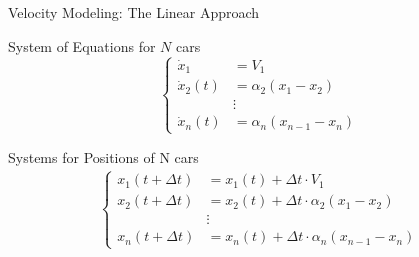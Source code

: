 \documentclass{beamer}
\begin{document}
\begin{frame}{Velocity Modeling: The Linear Approach}
	\begin{block}{System of Equations for $N$ cars}
		\[
		\left\{
		\begin{array}{ll}
			\dot{x}_1 &= V_1 \\
			\dot{x}_2(t) &= \alpha_2(x_1 - x_2) \\
			&\vdots \\
			\dot{x}_n(t) &= \alpha_n(x_{n-1} - x_n)
		\end{array}
		\right.
		\]
	\end{block}
	
	\begin{block}{Systems for Positions of N cars}
		\begin{align*}
			\left\{
			\begin{array}{ll}
				x_1(t + \Delta t) &= x_1(t) + \Delta t  \cdot V_1\\
				x_2(t + \Delta t) &= x_2(t) + \Delta t  \cdot \alpha_2(x_1 - x_2) \\
				&\vdots \\
				x_n(t + \Delta t) &= x_n(t) + \Delta t \cdot  \alpha_n(x_{n-1} - x_n)
			\end{array}
			\right.
		\end{align*}
	\end{block}
	
\end{frame}
\end{document}
